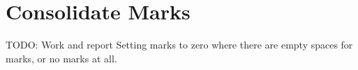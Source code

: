 \section{Consolidate Marks}
TODO: Work and report
Setting marks to zero where there are empty spaces for marks, or no marks at all.